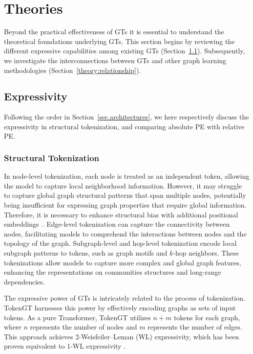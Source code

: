 


\section{Theories}
\label{sec.theory}
Beyond the practical effectiveness of GTs
it is essential to understand the theoretical foundations underlying GTs. 
This section begins by reviewing the different expressive capabilities among existing GTs (Section~\ref{theory:expressiveity}). Subsequently, we investigate the interconnections between GTs and other graph learning methodologies (Section~\ref{theory:relationship}).

\subsection{Expressivity}
\label{theory:expressiveity}
Following the order in Section~\ref{sec.architectures}, we here respectively discuss the expressivity in structural tokenization, and comparing absolute PE with relative PE.

\subsubsection{Structural Tokenization}
In node-level tokenization, each node is treated as an independent token, allowing the model to capture local neighborhood information. However, it may struggle to capture global graph structural patterns that span multiple nodes, potentially being insufficient for expressing graph properties that require global information. Therefore, it is necessary to enhance structural bias with additional positional embeddings~\cite{zhang2023rethinking}. Edge-level tokenization can capture the connectivity between nodes, facilitating models to comprehend the interactions between nodes and the topology of the graph. Subgraph-level and hop-level tokenization encode local subgraph patterns to tokens, such as graph motifs and $k$-hop neighbors. 
These tokenizations allow models to capture more complex and global graph features, enhancing the representations on communities structures and long-range dependencies.

The expressive power of GTs is intricately related to the process of tokenization. TokenGT \cite{TokenGT} harnesses this power by effectively encoding graphs as sets of input tokens. As a pure Transformer, TokenGT utilizes \(n + m\) tokens for each graph, where \(n\) represents the number of nodes and \(m\) represents the number of edges. This approach achieves 2-Weisfeiler–Leman (WL) expressivity, which has been proven equivalent to 1-WL expressivity \cite{Morris2021WeisfeilerAL}.

